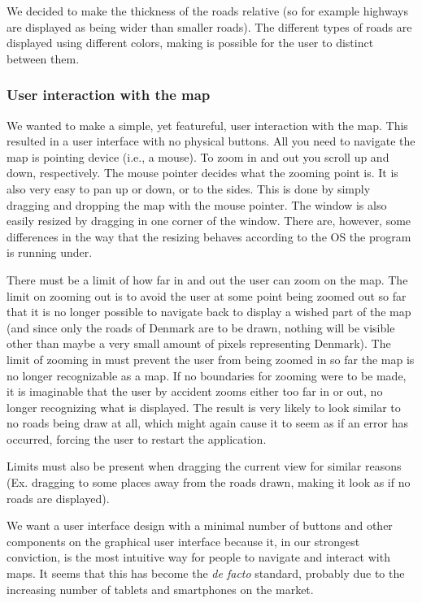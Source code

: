 \documentclass[a4paper,11pt]{article}
\begin{document}
We decided to make the thickness of the roads relative (so for example highways are displayed as being wider than smaller roads). The different types of roads are displayed using different colors, making is possible for the user to distinct between them.

\subsubsection{User interaction with the map}
We wanted to make a simple, yet featureful, user interaction with the map. This resulted in a user interface with no physical buttons. All you need to navigate the map is pointing device (i.e., a mouse). To zoom in and out you scroll up and down, respectively. The mouse pointer decides what the zooming point is. It is also very easy to pan up or down, or to the sides. This is done by simply dragging and dropping the map with the mouse pointer. The window is also easily resized by dragging in one corner of the window. There are, however, some differences in the way that the resizing behaves according to the OS the program is running under.

There must be a limit of how far in and out the user can zoom on the map. The limit on zooming out is to avoid the user at some point being zoomed out so far that it is no longer possible to navigate back to display a wished part of the map (and since only the roads of Denmark are to be drawn, nothing will be visible other than maybe a very small amount of pixels representing Denmark). The limit of zooming in must prevent the user from being zoomed in so far the map is no longer recognizable as a map. If no boundaries for zooming were to be made, it is imaginable that the user by accident zooms either too far in or out, no longer recognizing what is displayed. The result is very likely to look similar to no roads being draw at all, which might again cause it to seem as if an error has occurred, forcing the user to restart the application.

Limits must also be present when dragging the current view for similar reasons (Ex. dragging to some places away from the roads drawn, making it look as if no roads are displayed).

We want a user interface design with a minimal number of buttons and other components on the graphical user interface because it, in our strongest conviction, is the most intuitive way for people to navigate and interact with maps. It seems that this has become the \textit{de facto} standard, probably due to the increasing number of tablets and smartphones on the market.
\end{document}

